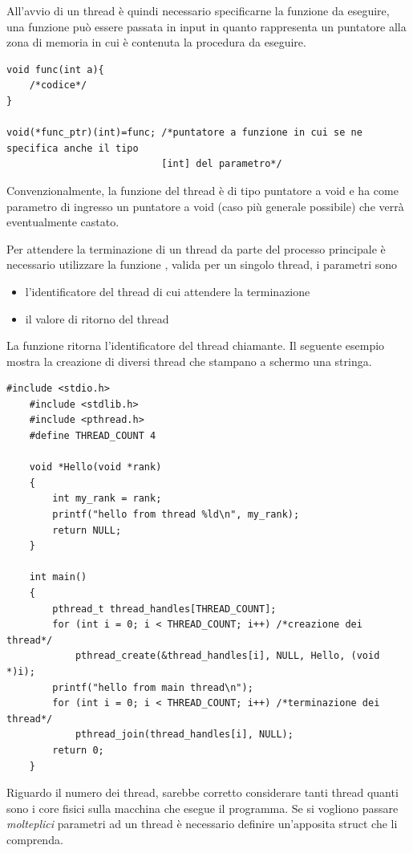 \documentclass[10pt, letterpaper]{report}
\begin{document}
All'avvio di un thread è quindi necessario specificarne la funzione da eseguire, una funzione può 
essere passata in input in quanto rappresenta un puntatore alla zona di memoria in cui è contenuta 
la procedura da eseguire.
\begin{lstlisting}[style=CStyle]
void func(int a){
    /*codice*/
}

void(*func_ptr)(int)=func; /*puntatore a funzione in cui se ne specifica anche il tipo 
                           [int] del parametro*/
\end{lstlisting}
Convenzionalmente, la funzione del thread è di tipo puntatore a void e ha come parametro di ingresso 
un puntatore a void (caso più generale possibile) che verrà eventualmente castato.\begin{quote}
\end{quote}
Per attendere la terminazione di un thread da parte del processo principale è necessario utilizzare 
la funzione , valida per un singolo thread, i parametri sono\begin{itemize}
    \item {} l'identificatore del thread di cui attendere la terminazione 
    \item {} il valore di ritorno del thread
\end{itemize}
La funzione  ritorna l'identificatore del thread chiamante. Il seguente esempio mostra 
la creazione di diversi thread che stampano a schermo una stringa.
\begin{lstlisting}[style=CStyle]
    #include <stdio.h>
    #include <stdlib.h>
    #include <pthread.h>
    #define THREAD_COUNT 4
    
    void *Hello(void *rank)
    {
        int my_rank = rank;
        printf("hello from thread %ld\n", my_rank);
        return NULL;
    }
    
    int main()
    {
        pthread_t thread_handles[THREAD_COUNT];
        for (int i = 0; i < THREAD_COUNT; i++) /*creazione dei thread*/
            pthread_create(&thread_handles[i], NULL, Hello, (void *)i);
        printf("hello from main thread\n");
        for (int i = 0; i < THREAD_COUNT; i++) /*terminazione dei thread*/
            pthread_join(thread_handles[i], NULL);
        return 0;
    }
\end{lstlisting}
Riguardo il numero dei thread, sarebbe corretto considerare tanti thread quanti sono i core fisici sulla 
macchina che esegue il programma. Se si vogliono passare \textit{molteplici} parametri ad un thread è necessario 
definire un'apposita struct che li comprenda.
\end{document}
